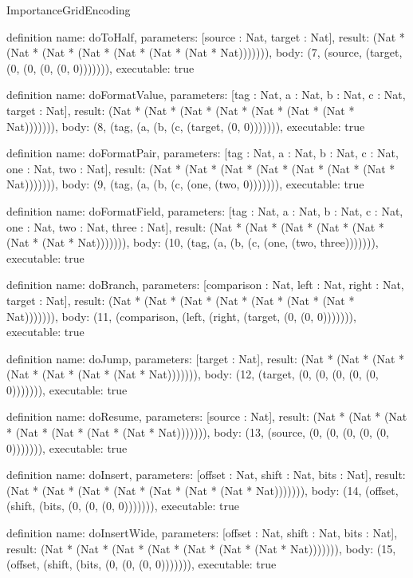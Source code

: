\begin{lexlean}{ImportanceGridEncoding}
\begin{semanticmodule}
definition{
  name: doToHalf,
  parameters: [source : Nat, target : Nat],
  result: (Nat * (Nat * (Nat * (Nat * (Nat * (Nat * (Nat * Nat))))))),
  body: (7, (source, (target, (0, (0, (0, (0, 0))))))),
  executable: true
}

definition{
  name: doFormatValue,
  parameters: [tag : Nat, a : Nat, b : Nat, c : Nat, target : Nat],
  result: (Nat * (Nat * (Nat * (Nat * (Nat * (Nat * (Nat * Nat))))))),
  body: (8, (tag, (a, (b, (c, (target, (0, 0))))))),
  executable: true
}

definition{
  name: doFormatPair,
  parameters: [tag : Nat, a : Nat, b : Nat, c : Nat, one : Nat, two : Nat],
  result: (Nat * (Nat * (Nat * (Nat * (Nat * (Nat * (Nat * Nat))))))),
  body: (9, (tag, (a, (b, (c, (one, (two, 0))))))),
  executable: true
}

definition{
  name: doFormatField,
  parameters: [tag : Nat, a : Nat, b : Nat, c : Nat, one : Nat, two : Nat, three : Nat],
  result: (Nat * (Nat * (Nat * (Nat * (Nat * (Nat * (Nat * Nat))))))),
  body: (10, (tag, (a, (b, (c, (one, (two, three))))))),
  executable: true
}

definition{
  name: doBranch,
  parameters: [comparison : Nat, left : Nat, right : Nat, target : Nat],
  result: (Nat * (Nat * (Nat * (Nat * (Nat * (Nat * (Nat * Nat))))))),
  body: (11, (comparison, (left, (right, (target, (0, (0, 0))))))),
  executable: true
}

definition{
  name: doJump,
  parameters: [target : Nat],
  result: (Nat * (Nat * (Nat * (Nat * (Nat * (Nat * (Nat * Nat))))))),
  body: (12, (target, (0, (0, (0, (0, (0, 0))))))),
  executable: true
}

definition{
  name: doResume,
  parameters: [source : Nat],
  result: (Nat * (Nat * (Nat * (Nat * (Nat * (Nat * (Nat * Nat))))))),
  body: (13, (source, (0, (0, (0, (0, (0, 0))))))),
  executable: true
}

definition{
  name: doInsert,
  parameters: [offset : Nat, shift : Nat, bits : Nat],
  result: (Nat * (Nat * (Nat * (Nat * (Nat * (Nat * (Nat * Nat))))))),
  body: (14, (offset, (shift, (bits, (0, (0, (0, 0))))))),
  executable: true
}

definition{
  name: doInsertWide,
  parameters: [offset : Nat, shift : Nat, bits : Nat],
  result: (Nat * (Nat * (Nat * (Nat * (Nat * (Nat * (Nat * Nat))))))),
  body: (15, (offset, (shift, (bits, (0, (0, (0, 0))))))),
  executable: true
}


\end{semanticmodule}
\end{lexlean}
